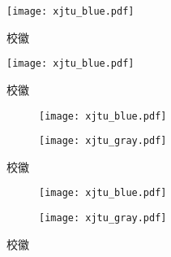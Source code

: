 
\begin{texcodeonly}[]{}
  \begin{figure}[H]
    \centering
    \texttt{[image: xjtu\_blue.pdf]}
    \caption{校徽}
  \end{figure}
\end{texcodeonly}

\begin{figure}[H]
  \centering
  \texttt{[image: xjtu\_blue.pdf]}
  \caption{校徽}
\end{figure}



\begin{texcodeonly}[]{}
  \begin{figure}[H]
    \begin{subfigure}[b]{0.49\linewidth}
        \centering
        \texttt{[image: xjtu\_blue.pdf]}
    \end{subfigure}
    \begin{subfigure}[b]{0.49\linewidth}
        \centering
        \texttt{[image: xjtu\_gray.pdf]}
        \label{subfigure:icon}
    \end{subfigure}
    \caption{校徽}
    \label{fig:icon}
  \end{figure}
\end{texcodeonly}

\begin{figure}[H]
  \begin{subfigure}[b]{0.49\linewidth}
      \centering
      \texttt{[image: xjtu\_blue.pdf]}
  \end{subfigure}
  \begin{subfigure}[b]{0.49\linewidth}
      \centering
      \texttt{[image: xjtu\_gray.pdf]}
      \label{subfigure:icon}
  \end{subfigure}
  \caption{校徽}
  \label{figure:icon}
\end{figure}


\newcommand{\subfigg}{
  \begin{subfigure}[b]{0.49\linewidth}
    \centering
    \texttt{[image: xjtu\_blue.pdf]}
    \subcaption{蓝色校徽}
  \end{subfigure}
}

